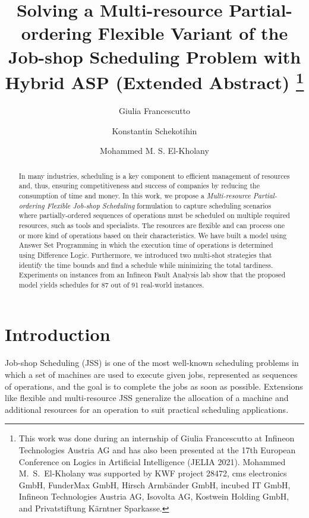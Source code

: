 \documentclass[submission,copyright,creativecommons]{eptcs}
\title{Solving a Multi-resource Partial-ordering Flexible Variant of the Job-shop Scheduling Problem with Hybrid ASP (Extended Abstract) \thanks{This work was done during an internship of Giulia Francescutto at Infineon Technologies Austria AG and has also been presented at the 17th European Conference on Logics in Artificial Intelligence (JELIA 2021).
Mohammed M.\ S.\ El-Kholany was supported by
KWF project 28472,
cms electronics GmbH,
FunderMax GmbH,
Hirsch Armbänder GmbH,
incubed IT GmbH,
Infineon Technologies Austria AG,
Isovolta AG,
Kostwein Holding GmbH, and
Privatstiftung Kärntner Sparkasse.}}
\author{Giulia Francescutto
\institute{Siemens AG {\"O}sterreich, Vienna, Austria}
\email{giulia.francescutto@siemens.com}
\and
Konstantin Schekotihin
\institute{University of Klagenfurt,
Klagenfurt, Austria}
\email{konstantin.schekotihin@aau.at}
\and
Mohammed M. S. El-Kholany
\institute{University of Klagenfurt, Klagenfurt, Austria}
\institute{Cairo University, Cairo, Egypt}
\email{mohammed.el-kholany@aau.at}
}
\newcommand{\jss}{MPF-JSS\xspace}
\begin{document}
\maketitle

\begin{abstract}
  In many industries, scheduling is a key component to efficient management of resources and, thus, ensuring competitiveness and success of companies by reducing the consumption of time and money. In this work, we propose a \emph{Multi-resource Partial-ordering Flexible Job-shop Scheduling} %
  formulation to capture scheduling scenarios where partially-ordered sequences of operations must be scheduled on multiple required resources, such as tools and specialists.
  The resources are flexible and can process one or more kind of operations based on their characteristics. We have built a model using Answer Set Programming %
  in which the execution time of operations is determined using Difference Logic. Furthermore, we introduced two multi-shot strategies that identify the time bounds and find a schedule while minimizing the total tardiness. 
  Experiments on %
  instances from an Infineon Fault Analysis lab %
  show that the proposed model %
  yields schedules for 87 out of 91 real-world instances.
\end{abstract}

\section{Introduction}
Job-shop Scheduling (JSS) \cite{johnson1954optimal} is one of the most well-known scheduling problems in which a set of machines are used to execute given jobs, represented as sequences of operations, and the goal is to complete the jobs as soon as possible.
Extensions like flexible \cite{brucker1990job} and multi-resource
\cite{DBLP:journals/eor/Dauzere-PeresRL98} JSS
generalize the allocation of a machine and additional resources for an operation
to suit practical scheduling applications.
\end{document}
